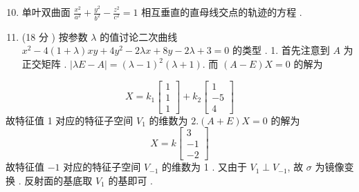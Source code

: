 \documentclass[10pt]{article}
\begin{document}
\begin{enumerate}
  \setcounter{enumi}{9}
  \item  单叶双曲面  $\frac{x^{2}}{a^{2}}+\frac{y^{2}}{b^{2}}-\frac{z^{2}}{c^{2}}=1$  相互垂直的直母线交点的轨迹的方程 .

  \item (18  分 )  按参数  $\lambda$  的值讨论二次曲线  $x^{2}-4(1+\lambda) x y+4 y^{2}-2 \lambda x+8 y-2 \lambda+3=0$  的类型 . 1.  首先注意到  $A$  为正交矩阵 . $|\lambda E-A|=(\lambda-1)^{2}(\lambda+1)$.  而  $(A-E) X=0$  的解为 

\end{enumerate}
$$
X=k_{1}\left[\begin{array}{l}
1 \\
1 \\
1
\end{array}\right]+k_{2}\left[\begin{array}{c}
1 \\
-5 \\
4
\end{array}\right]
$$
 故特征值  1  对应的特征子空间  $V_{1}$  的维数为  $2 .(A+E) X=0$  的解为 
$$
X=k\left[\begin{array}{c}
3 \\
-1 \\
-2
\end{array}\right]
$$
 故特征值  $-1$  对应的特征子空间  $V_{-1}$  的维数为  1 .  又由于  $V_{1} \perp V_{-1}$,  故  $\sigma$  为镜像变换 .  反射面的基底取  $V_{1}$  的基即可 .
\end{document}
